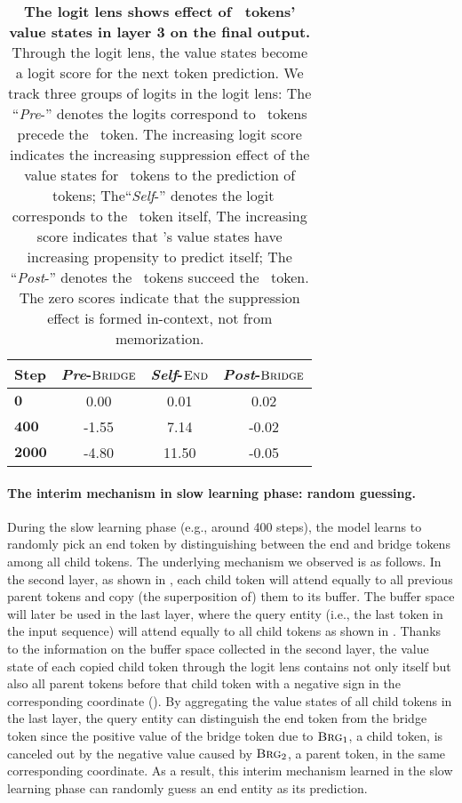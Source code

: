 \begin{table}[h]
    \centering
    \renewcommand{\arraystretch}{1} %
    \begin{tabular}{lccc}
        \toprule
        \textbf{Step} & \textit{Pre}-$\textsc{Bridge}$ & \textit{Self}-$\textsc{End}$ & \textit{Post}-$\textsc{Bridge}$ \\
        \midrule
        $\mathbf{0}$ & 0.00 & 0.01 & 0.02 \\
        $\mathbf{400}$ & -1.55 & 7.14 & -0.02 \\
        $\mathbf{2000}$ & -4.80 & 11.50 & -0.05 \\
        \bottomrule
    \end{tabular}
    \caption{\textbf{The logit lens shows effect of \Ed~tokens' value states in layer 3 on the final output.} Through the logit lens, the value states become a logit score for the next token prediction. We track three groups of logits in the logit lens: The ``\textit{Pre}-\brg'' denotes the logits correspond to \brg~tokens precede the \Ed~token. The increasing logit score indicates the increasing suppression effect of the value states for \Ed~tokens to the prediction of \brg~tokens; The``\textit{Self}-\Ed'' denotes the logit corresponds to the \Ed~token itself, The increasing score indicates that \Ed's value states have increasing propensity to predict itself; The ``\textit{Post}-\brg'' denotes the \brg~tokens succeed the \Ed~token. The zero scores indicate that the suppression effect is formed in-context, not from memorization.}
    \label{tab:logit_lens_value}
\end{table}


\paragraph{The interim mechanism in slow learning phase: random guessing.} During the slow learning phase (e.g., around 400 steps), the model learns to randomly pick an end token by distinguishing between the end and bridge tokens among all child tokens. The underlying mechanism we observed is as follows. In the second layer, as shown in , each child token will attend equally to all previous parent tokens and copy (the superposition of) them to its buffer.  The buffer space will later be used in the last layer, where the query entity (i.e., the last token in the input sequence) will attend equally to all child tokens as shown in .  Thanks to the information on the buffer space collected in the second layer, the value state of each copied child token through the logit lens contains not only itself but also all parent tokens before that child token with a negative sign in the corresponding coordinate (). By aggregating the value states of all child tokens in the last layer, the query entity can distinguish the end token from the bridge token since the positive value of the bridge token due to $\textsc{Brg$_1$}$, a child token, is canceled out by the negative value caused by $\textsc{Brg$_2$}$, a parent token, in the same corresponding coordinate. As a result, this interim mechanism learned in the slow learning phase can randomly guess an end entity as its prediction.

